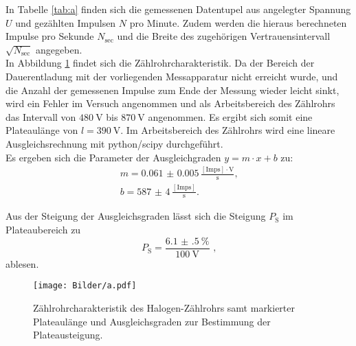 In Tabelle \ref{tab:a} finden sich die gemessenen Datentupel aus angelegter Spannung $U$ und gezählten Impulsen $N$ pro Minute. Zudem werden die hieraus berechneten Impulse pro Sekunde $N_\mathrm{sec}$ und die Breite des zugehörigen Vertrauensintervall $\sqrt{N_\mathrm{sec}}$ angegeben.\\
In Abbildung \ref{fig:a} findet sich die Zählrohrcharakteristik.
Da der Bereich der Dauerentladung mit der vorliegenden Messapparatur nicht erreicht wurde, und die Anzahl der gemessenen Impulse zum Ende der Messung wieder leicht sinkt, wird ein Fehler im Versuch angenommen und als Arbeitsbereich des Zählrohrs das Intervall von $\SI{480}{\volt}$ bis $\SI{870}{\volt}$ angenommen.
Es ergibt sich somit eine Plateaulänge von $l=\SI{390}{\volt}$.
Im Arbeitsbereich des Zählrohrs wird eine lineare Ausgleichsrechnung mit python/scipy \cite{scipy} durchgeführt.\\
Es ergeben sich die Parameter der Ausgleichgraden $y=m\cdot x+b$ zu:
\begin{align}
  m=  \num{0.061(5)}\,\frac{\mathrm{[Imps]}\cdot \si{\volt}}{\si{\second}} \text{,}\\
  b=  \num{587(4)}\,\frac{\mathrm{[Imps]}}{\si{\second}}\text{.}
\end{align}

Aus der Steigung der Ausgleichsgraden lässt sich die Steigung $P_\mathrm{S}$ im Plateaubereich zu
\begin{equation*}
  P_\mathrm{S}=\frac{\SI{6.1(5)}{\percent}}{\SI{100}{\volt}} \text{ ,}
\end{equation*}
ablesen.
\begin{figure}
  \centering
  \texttt{[image: Bilder/a.pdf]}
  \caption{Zählrohrcharakteristik des Halogen-Zählrohrs samt markierter Plateaulänge und Ausgleichsgraden zur Bestimmung der Plateausteigung.}
  \label{fig:a}
\end{figure}
\FloatBarrier






